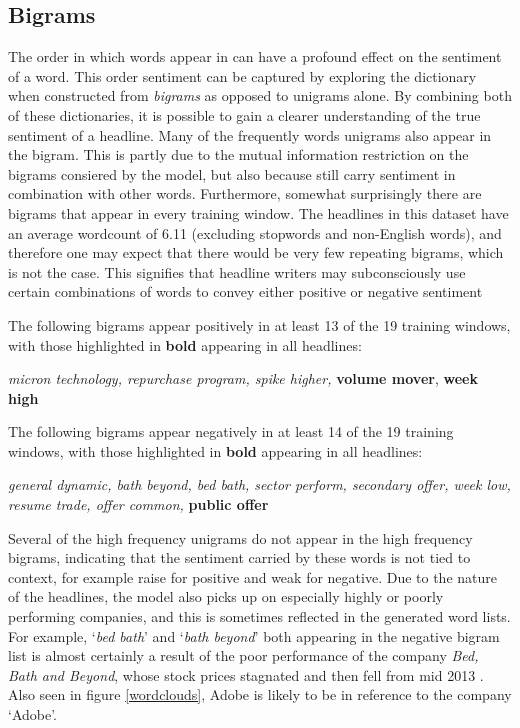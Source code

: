 \subsection{Bigrams}
\label{sub:bigram-analysis}
The order in which words appear in can have a profound effect on the sentiment of a word. This order sentiment can be captured by exploring the dictionary when constructed from \textit{bigrams} as opposed to unigrams alone. By combining both of these dictionaries, it is possible to gain a clearer understanding of the true sentiment of a headline. Many of the frequently  words unigrams also appear in the bigram. This is partly due to the mutual information restriction on the bigrams consiered by the model, but also because still carry sentiment in combination with other words. Furthermore, somewhat surprisingly there are bigrams that appear in every training window. The headlines in this dataset have an average wordcount of 6.11 (excluding stopwords and non-English words), and therefore one may expect that there would be very few repeating bigrams, which is not the case. This signifies that headline writers may subconsciously use certain combinations of words to convey either positive or negative sentiment

The following bigrams appear positively in at least 13 of the 19 training windows, with those highlighted in \textbf{bold} appearing in all headlines:
\begin{center}
\textit{micron technology, repurchase program, spike higher,} \textbf{volume mover}, \textbf{week high}
\end{center}

The following bigrams appear negatively in at least 14 of the 19 training windows, with those highlighted in \textbf{bold} appearing in all headlines:
\begin{center}
      \textit{general dynamic, bath beyond, bed bath, sector perform, secondary offer, week low, resume trade, offer common,} \textbf{public offer}
\end{center}

Several of the high frequency unigrams do not appear in the high frequency bigrams, indicating that the sentiment carried by these words is not tied to context, for example raise for positive and weak for negative. Due to the nature of the headlines, the model also picks up on especially highly or poorly performing companies, and this is sometimes reflected in the generated word lists. For example, `\textit{bed bath}' and `\textit{bath beyond}' both appearing in the negative bigram list is almost certainly a result of the poor performance of the company \textit{Bed, Bath and Beyond}, whose stock prices stagnated and then fell from mid 2013 \parencite{bed-bath-yahoo}. Also seen in figure \ref{wordclouds}, Adobe is likely to be in reference to the company `Adobe'.


